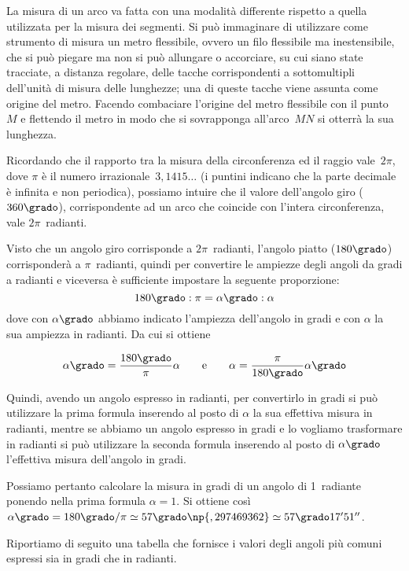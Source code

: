 \begin{osservazione}
La misura di un arco va fatta con una modalità differente rispetto a 
quella utilizzata per la misura dei segmenti. Si può immaginare di 
utilizzare come strumento di misura un metro flessibile, ovvero un 
filo flessibile ma inestensibile, che si può piegare ma non si può 
allungare o accorciare, su cui siano state tracciate, a distanza 
regolare, delle tacche corrispondenti a sottomultipli dell'unità di 
misura delle lunghezze; una di queste tacche viene assunta come 
origine del metro. Facendo combaciare l'origine del metro flessibile 
con il punto~$M$ e flettendo il metro in modo che si sovrapponga 
all'arco~$MN$ si otterrà la sua lunghezza.
\end{osservazione}

Ricordando che il rapporto tra la misura della circonferenza ed il 
raggio vale~$2\pi$, dove $\pi$ è il numero 
irrazionale~$3,1415\ldots{}$ (i puntini indicano che la parte 
decimale è infinita e non periodica), possiamo intuire che il valore 
dell'angolo giro ($360\grado$), corrispondente ad un arco che 
coincide con l'intera circonferenza, vale $2\pi$~radianti.

Visto che un angolo giro corrisponde a $2\pi$~radianti, l'angolo 
piatto ($180\grado$) corrisponderà a $\pi$~radianti, quindi per 
convertire le ampiezze degli angoli da gradi a radianti e viceversa è 
sufficiente impostare la seguente proporzione:
\[180\grado : \pi = \alpha\grado : \alpha\]
dove con $\alpha\grado$ abbiamo indicato l'ampiezza dell'angolo in 
gradi e con $\alpha$ la sua ampiezza in radianti. Da cui si ottiene

\[\alpha\grado = 
\dfrac{180\grado}{\pi}\alpha\qquad\text{e}\qquad\alpha = 
\dfrac{\pi}{180\grado}\alpha\grado\]

Quindi, avendo un angolo espresso in radianti, per convertirlo in 
gradi si può utilizzare la prima formula inserendo al posto di 
$\alpha$ la sua effettiva misura in radianti, mentre se abbiamo un 
angolo espresso in gradi e lo vogliamo trasformare in radianti si può 
utilizzare la seconda formula inserendo al posto di $\alpha\grado$ 
l'effettiva misura dell'angolo in gradi.

Possiamo pertanto calcolare la misura in gradi di un angolo di 
1~radiante ponendo nella prima formula $\alpha=1$. Si ottiene così 
$\alpha\grado = 180\grado/\pi \simeq 57\grado\np{,297469362} \simeq 
57\grado 17'51''$.

Riportiamo di seguito una tabella che fornisce i valori degli angoli 
più comuni espressi sia in gradi che in radianti.

